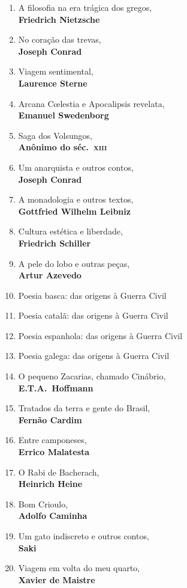 \begin{enumerate} [font=\Formular\footnotesize]
\item A filosofia na era trágica dos gregos,\\ \textbf{Friedrich Nietzsche}
\item No coração das trevas,\\ \textbf{Joseph Conrad}
\item Viagem sentimental,\\ \textbf{Laurence Sterne}
\item Arcana C\oe lestia e Apocalipsis revelata,\\ \textbf{Emanuel Swedenborg}
\item Saga dos Volsungos,\\ \textbf{Anônimo do séc.~\textsc{xiii}}
\item Um anarquista e outros contos,\\ \textbf{Joseph Conrad}
\item A monadologia e outros textos,\\ \textbf{Gottfried Wilhelm Leibniz}
\item Cultura estética e liberdade,\\ \textbf{Friedrich Schiller}
\item A pele do lobo e outras peças,\\ \textbf{Artur Azevedo}
\item Poesia basca: das origens à Guerra Civil 
\item Poesia catalã: das origens à Guerra Civil 
\item Poesia espanhola: das origens à Guerra Civil 
\item Poesia galega: das origens à Guerra Civil 
\item O pequeno Zacarias, chamado Cinábrio,\\ \textbf{E.T.A.~Hoffmann}
\item Tratados da terra e gente do Brasil,\\ \textbf{Fernão Cardim}
\item Entre camponeses,\\ \textbf{Errico Malatesta}
\item O Rabi de Bacherach,\\ \textbf{Heinrich Heine}
\item Bom Crioulo,\\ \textbf{Adolfo Caminha}
\item Um gato indiscreto e outros contos,\\ \textbf{Saki}
\item Viagem em volta do meu quarto,\\ \textbf{Xavier de Maistre }

\end{enumerate}

